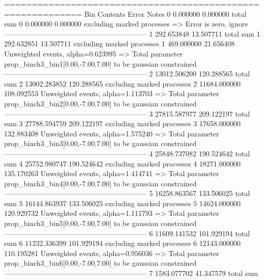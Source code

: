 ============================================================
Bin        Contents        Error           Notes                         
0          0.000000        0.000000        total sum                     
0          0.000000        0.000000        excluding marked processes    
  => Error is zero, ignore      
------------------------------------------------------------
1          292.653848      13.507711       total sum                     
1          292.632851      13.507711       excluding marked processes    
1          469.000000      21.656408       Unweighted events, alpha=0.623995
  => Total parameter prop_binch3_bin1[0.00,-7.00,7.00] to be gaussian constrained
------------------------------------------------------------
2          13012.506200    120.288565      total sum                     
2          13002.283852    120.288565      excluding marked processes    
2          11684.000000    108.092553      Unweighted events, alpha=1.113703
  => Total parameter prop_binch3_bin2[0.00,-7.00,7.00] to be gaussian constrained
------------------------------------------------------------
3          27815.587977    209.122197      total sum                     
3          27788.594759    209.122197      excluding marked processes    
3          17658.000000    132.883408      Unweighted events, alpha=1.575240
  => Total parameter prop_binch3_bin3[0.00,-7.00,7.00] to be gaussian constrained
------------------------------------------------------------
4          25848.737082    190.524642      total sum                     
4          25752.980747    190.524642      excluding marked processes    
4          18271.000000    135.170263      Unweighted events, alpha=1.414741
  => Total parameter prop_binch3_bin4[0.00,-7.00,7.00] to be gaussian constrained
------------------------------------------------------------
5          16258.863567    133.506025      total sum                     
5          16144.863937    133.506025      excluding marked processes    
5          14624.000000    120.929732      Unweighted events, alpha=1.111793
  => Total parameter prop_binch3_bin5[0.00,-7.00,7.00] to be gaussian constrained
------------------------------------------------------------
6          11609.141532    101.929194      total sum                     
6          11232.336399    101.929194      excluding marked processes    
6          12143.000000    110.195281      Unweighted events, alpha=0.956036
  => Total parameter prop_binch3_bin6[0.00,-7.00,7.00] to be gaussian constrained
------------------------------------------------------------
7          1583.077702     41.347579       total sum                     
